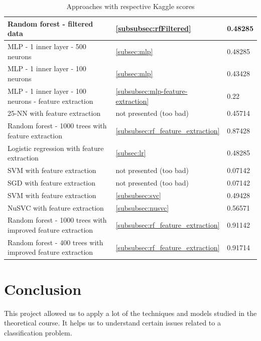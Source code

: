 \documentclass[a4paper, 11pt, oneside]{article}
\begin{document}
\begin{table}[H]
\begin{tabular}{|l|l|l|}
Random forest - filtered data                               & \ref{subsubsec:rfFiltered}                   & 0.48285                                    \\ \hline
MLP - 1 inner layer - 500 neurons                           & \ref{subsec:mlp}                               & 0.48285                                    \\ \hline
MLP - 1 inner layer - 100 neurons                           & \ref{subsec:mlp}                                 & 0.43428                                    \\ \hline
MLP - 1 inner layer - 100 neurons - feature extraction      & \ref{subsubsec:mlp-feature-extraction}                                  & 0.22                                       \\ \hline
25-NN with feature extraction                               & not presented (too bad)                               & 0.45714                                    \\ \hline
Random forest - 1000 trees with feature extraction          & \ref{subsubsec:rf_feature_extraction}                                & 0.87428                                    \\ \hline
Logistic regression with feature extraction                 & \ref{subsec:lr}                               & 0.48285                                    \\ \hline
SVM with feature extraction                                 & not presented (too bad)                                 & 0.07142                                    \\ \hline
SGD with feature extraction                                 & not presented (too bad)                                  & 0.07142                                    \\ \hline
SVM with feature extraction                                 & \ref{subsubsec:svc}                          & 0.49428                                    \\ \hline
NuSVC with feature extraction                               & \ref{subsubsec:nusvc}                        & 0.56571                                    \\ \hline
Random forest - 1000 trees with improved feature extraction & \ref{subsubsec:rf_feature_extraction}                                 & 0.91142                                    \\ \hline
Random forest - 400 trees with improved feature extraction & \ref{subsubsec:rf_feature_extraction}                                 & 0.91714                                   \\ \hline
\end{tabular}
\caption{Approaches with respective Kaggle scores}
\end{table}

\section{Conclusion}

This project allowed us to apply a lot of the techniques and models studied in the theoretical course. It helps us to understand certain issues related to a classification problem.

\end{document}
